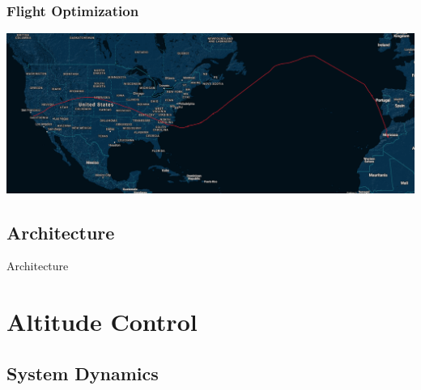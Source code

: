 \documentclass[10pt,mathserif]{beamer}
\begin{document}
\begin{frame}
\frametitle{Flight Optimization}
\begin{center}
\hspace*{-1.4cm}\includegraphics[width=1.2\linewidth,trim={0 0cm 0 0cm},clip]{f8.png}
\end{center}
\end{frame}

\subsection{Architecture}
\begin{frame}{Architecture}
\end{frame}

\section{Altitude Control}
\subsection{System Dynamics}
\end{document}

